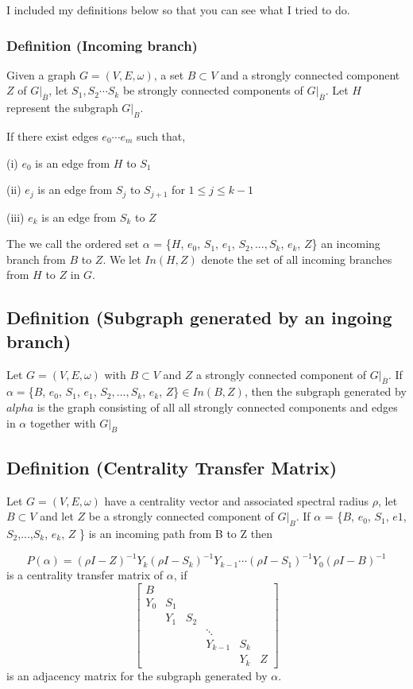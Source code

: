 \documentclass{paper}
\begin{document}
I included my definitions below so that you can see what I tried to do. 


\subsubsection*{Definition (Incoming branch)}

Given a graph $G = (V,E,\omega)$, a set $B \subset V$ and a strongly connected component $Z$ of $G|_{\overline{B}}$, let $S_1,S_2 \cdots S_k$ be strongly connected components of $G|_{\overline{B}}$. Let $H$ represent the subgraph $G|_B$.

If there exist edges $e_0 \cdots e_m$  such that,

(i) $e_0$ is an edge from $H$ to $S_1$

(ii) $e_j$ is an edge from $S_j$ to $S_{j+1}$ for $1 \leq j \leq k-1$

(iii) $e_k$ is an edge from $S_k$ to $Z$

The we call the ordered set $\alpha$ = \{$H$, $e_0$, $S_1$, $e_1$, $S_2,...,S_k$, $e_k$, $Z$\} an incoming branch from $B$ to $Z$. We let $In(H,Z)$ denote the set of all incoming branches from $H$ to $Z$ in $G$.


\subsection*{Definition (Subgraph generated by an ingoing branch)}
Let $G = (V,E,\omega)$ with $B \subset V$ and $Z$ a strongly connected component of $G|_{\overline{B}}$. If $\alpha = $\{$B$, $e_0$, $S_1$, $e_1$, $S_2,...,S_k$, $e_k$, $Z$\}$ \in In(B,Z)$, then the subgraph generated by $alpha$ is the graph consisting of all all strongly connected components and edges in $\alpha$ together with $G|_{B}$

\subsection*{Definition (Centrality Transfer Matrix)}
Let $G = (V,E,\omega)$ have a centrality vector and associated spectral radius $\rho$, let $B \subset V$ and let $Z$ be a strongly connected component of $G|_B$. If $\alpha$ = \{$B$, $e_0$, $S_1$, $e1$, $S_2$,...,$S_k$, $e_k$, $Z$ \} is an incoming path from B to Z then

\[
P(\alpha) = (\rho I - Z)^{-1}Y_k(\rho I - S_k)^{-1}Y_{k-1}\cdots (\rho I - S_1)^{-1}Y_0(\rho I - B)^{-1}
\]
is a centrality transfer matrix of $\alpha$, if
\[
 \begin{bmatrix}
B \\
Y_0 & S_1 \\
    & Y_1 & S_2 \\
    &     &     & \ddots \\
&&& Y_{k-1} & S_k \\
&&&& Y_k & Z 
\end{bmatrix}
\]
is an adjacency matrix for the subgraph generated by $\alpha$.
\end{document}
